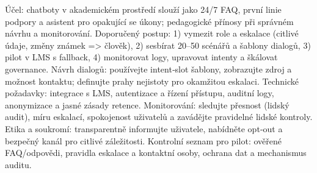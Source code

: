 \begin{flushleft}
Účel: chatboty v akademickém prostředí slouží jako 24/7 FAQ, první linie podpory a asistent pro opakující se úkony; pedagogické přínosy při správném návrhu a monitorování.
Doporučený postup: 1) vymezit role a eskalace (citlivé údaje, změny známek => člověk), 2) sesbírat 20–50 scénářů a šablony dialogů, 3) pilot v LMS s fallback, 4) monitorovat logy, upravovat intenty a škálovat governance.
Návrh dialogů: používejte intent‑slot šablony, zobrazujte zdroj a možnost kontaktu; definujte prahy nejistoty pro okamžitou eskalaci.
Technické požadavky: integrace s LMS, autentizace a řízení přístupu, auditní logy, anonymizace a jasné zásady retence.
Monitorování: sledujte přesnost (lidský audit), míru eskalací, spokojenost uživatelů a zavádějte pravidelné lidské kontroly.
Etika a soukromí: transparentně informujte uživatele, nabídněte opt‑out a bezpečný kanál pro citlivé záležitosti.
Kontrolní seznam pro pilot: ověřené FAQ/odpovědi, pravidla eskalace a kontaktní osoby, ochrana dat a mechanismus auditu.
\end{flushleft}